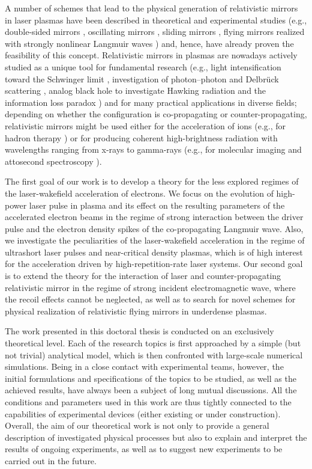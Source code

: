 \documentclass[10pt, a4paper, twoside, openright]{report}
\begin{document}
A number of schemes that lead to the physical generation of relativistic mirrors in laser plasmas have been described in theoretical and experimental studies (e.g., double-sided mirrors \cite{Kulagin2007a, Esirkepov2009, Wu2010, Kiefer2013, Ma2014}, oscillating mirrors \cite{Bulanov1994, Lichters1996, Naumova2004, Wheeler2012, Vincenti2019}, sliding mirrors \cite{Pirozhkov2006}, flying mirrors realized with strongly nonlinear Langmuir waves \cite{Bulanov2003, Kando2007, Pirozhkov2007, Kando2009}) and, hence, have already proven the feasibility of this concept. Relativistic mirrors in plasmas are nowadays actively studied as a unique tool for fundamental research (e.g., light intensification toward the Schwinger limit \cite{Bulanov2003}, investigation of photon–photon and Delbrück scattering \cite{Koga2012, Koga2018}, analog black hole to investigate Hawking radiation and the information loss paradox \cite{Chen2017, Chen2020}) and for many practical applications in diverse fields; depending on whether the configuration is co-propagating or counter-propagating, relativistic mirrors might be used either for the acceleration of ions (e.g., for hadron therapy \cite{Bulanov2002}) or for producing coherent high-brightness radiation with wavelengths ranging from x-rays to gamma-rays (e.g., for molecular imaging \cite{Neutze2000} and attosecond spectroscopy \cite{Krausz2009}).

The first goal of our work is to develop a theory for the less explored regimes of the laser-wakefield acceleration of electrons. We focus on the evolution of high-power laser pulse in plasma and its effect on the resulting parameters of the accelerated electron beams in the regime of strong interaction between the driver pulse and the electron density spikes of the co-propagating Langmuir wave. Also, we investigate the peculiarities of the laser-wakefield acceleration in the regime of ultrashort laser pulses and near-critical density plasmas, which is of high interest for the acceleration driven by high-repetition-rate laser systems. Our second goal is to extend the theory for the interaction of laser and counter-propagating relativistic mirror in the regime of strong incident electromagnetic wave, where the recoil effects cannot be neglected, as well as to search for novel schemes for physical realization of relativistic flying mirrors in underdense plasmas.

The work presented in this doctoral thesis is conducted on an exclusively theoretical level. Each of the research topics is first approached by a simple (but not trivial) analytical model, which is then confronted with large-scale numerical simulations. Being in a close contact with experimental teams, however, the initial formulations and specifications of the topics to be studied, as well as the achieved results, have always been a subject of long mutual discussions. All the conditions and parameters used in this work are thus tightly connected to the capabilities of experimental devices (either existing or under construction). Overall, the aim of our theoretical work is not only to provide a general description of investigated physical processes but also to explain and interpret the results of ongoing experiments, as well as to suggest new experiments to be carried out in the future.
\end{document}
